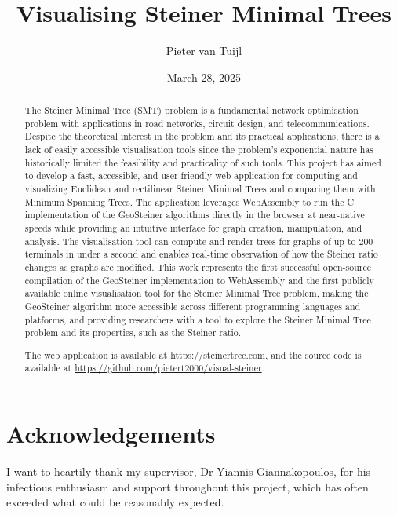 \documentclass{l4proj}
\begin{document}
\title{Visualising Steiner Minimal Trees}
\author{Pieter van Tuijl}
\date{March 28, 2025}

\maketitle

\begin{abstract}
    The Steiner Minimal Tree (SMT) problem is a fundamental network optimisation problem with applications in road networks, circuit design, and telecommunications. Despite the theoretical interest in the problem and its practical applications, there is a lack of easily accessible visualisation tools since the problem's exponential nature has historically limited the feasibility and practicality of such tools. This project has aimed to develop a fast, accessible, and user-friendly web application for computing and visualizing Euclidean and rectilinear Steiner Minimal Trees and comparing them with Minimum Spanning Trees. The application leverages WebAssembly to run the C implementation of the GeoSteiner algorithms directly in the browser at near-native speeds while providing an intuitive interface for graph creation, manipulation, and analysis. The visualisation tool can compute and render trees for graphs of up to 200 terminals in under a second and enables real-time observation of how the Steiner ratio changes as graphs are modified. This work represents the first successful open-source compilation of the GeoSteiner implementation to WebAssembly and the first publicly available online visualisation tool for the Steiner Minimal Tree problem, making the GeoSteiner algorithm more accessible across different programming languages and platforms, and providing researchers with a tool to explore the Steiner Minimal Tree problem and its properties, such as the Steiner ratio.

    The web application is available at \url{https://steinertree.com}, and the source code is available at \url{https://github.com/pietert2000/visual-steiner}.
\end{abstract}

\chapter*{Acknowledgements}
I want to heartily thank my supervisor, Dr Yiannis Giannakopoulos, for his infectious enthusiasm and support throughout this project, which has often exceeded what could be reasonably expected.
\end{document}
